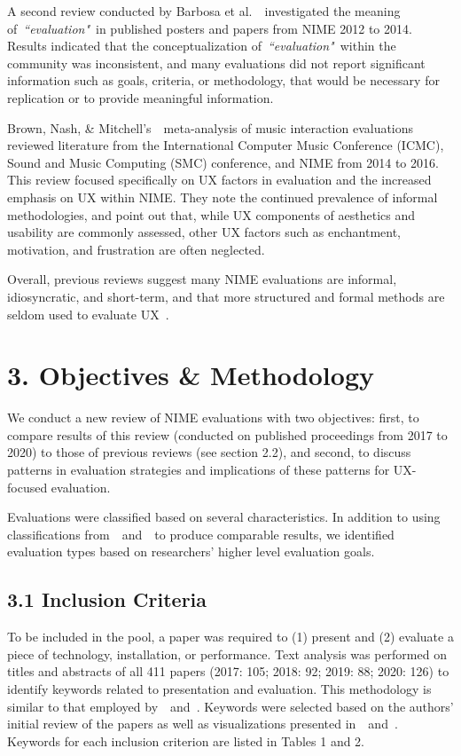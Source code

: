 \documentclass[sigconf]{nimeart}
\begin{document}
A second review conducted by Barbosa et al.~\cite{c2}~investigated the meaning of~\emph{``evaluation"}~in published posters and papers from NIME 2012 to 2014. Results indicated that the conceptualization of~\emph{``evaluation"}~within the community was inconsistent, and many evaluations did not report significant information such as goals, criteria, or methodology, that would be necessary for replication or to provide meaningful information.

Brown, Nash, \& Mitchell's~\cite{c3}~meta-analysis of music interaction evaluations reviewed literature from the International Computer Music Conference (ICMC), Sound and Music Computing (SMC) conference, and NIME from 2014 to 2016. This review focused specifically on UX factors in evaluation and the increased emphasis on UX within NIME. They note the continued prevalence of informal methodologies, and point out that, while UX components of aesthetics and usability are commonly assessed, other UX factors such as enchantment, motivation, and frustration are often neglected.~

Overall, previous reviews suggest many NIME evaluations are informal, idiosyncratic, and short-term, and that more structured and formal methods are seldom used to evaluate UX~\cite{c21}.~

\section{3. Objectives \& Methodology}\label{objectives-methodology}

We conduct a new review of NIME evaluations with two objectives: first, to compare results of this review (conducted on published proceedings from 2017 to 2020) to those of previous reviews (see section 2.2), and second, to discuss patterns in evaluation strategies and implications of these patterns for UX-focused evaluation.

Evaluations were classified based on several characteristics. In addition to using classifications from~\cite{c2}~and~\cite{c3}~to produce comparable results, we identified evaluation types based on researchers' higher level evaluation goals.

\subsection{3.1 Inclusion Criteria}\label{inclusion-criteria}

To be included in the pool, a paper was required to (1) present and (2) evaluate a piece of technology, installation, or performance. Text analysis was performed on titles and abstracts of all 411 papers (2017: 105; 2018: 92; 2019: 88; 2020: 126) to identify keywords related to presentation and evaluation. This methodology is similar to that employed by~\cite{c2}~and~\cite{c3}. Keywords were selected based on the authors' initial review of the papers as well as visualizations presented in~\cite{c2}~and~\cite{c3}. Keywords for each inclusion criterion are listed in Tables 1 and 2.
\end{document}
